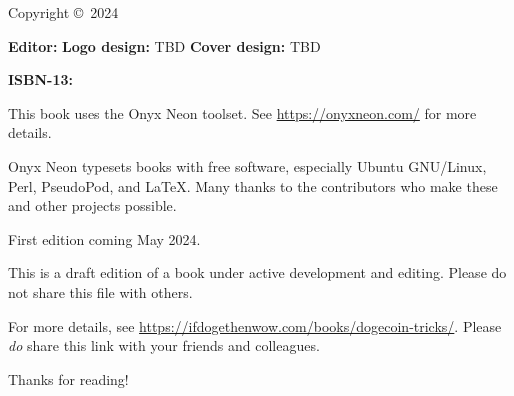 \thispagestyle{empty}

\huge{\booktitle}
\newline
\large{\booksubtitle}
\newline
\newline
\normalsize

Copyright \copyright~2024 \bookauthor

\vfill
\textbf{Editor:} \bookauthor\newline
\textbf{Logo design:} TBD\newline
\textbf{Cover design:} TBD

\textbf{ISBN-13:} \bookisbnthirteen

This book uses the Onyx Neon toolset. See \url{https://onyxneon.com/} for more
details.

Onyx Neon typesets books with free software, especially Ubuntu GNU/Linux, Perl,
PseudoPod, and \LaTeX. Many thanks to the contributors who make these and other
projects possible.

First edition coming May 2024.

This is a draft edition of a book under active development and editing. Please do not share this file with others.

For more details, see \url{https://ifdogethenwow.com/books/dogecoin-tricks/}.
Please \emph{do} share this link with your friends and colleagues.

Thanks for reading!
